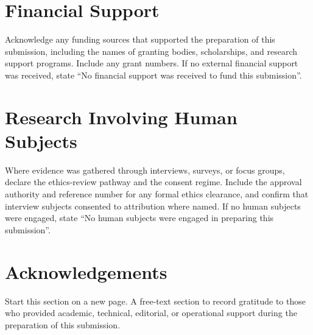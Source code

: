 \section{Financial Support}

\begin{instructional}
Acknowledge any funding sources that supported the preparation of this submission, including the names of granting bodies, scholarships, and research support programs. Include any grant numbers. If no external financial support was received, state ``No financial support was received to fund this submission''.
\end{instructional}


\section{Research Involving Human Subjects}

\begin{instructional}
Where evidence was gathered through interviews, surveys, or focus groups, declare the ethics-review pathway and the consent regime. Include the approval authority and reference number for any formal ethics clearance, and confirm that interview subjects consented to attribution where named. If no human subjects were engaged, state ``No human subjects were engaged in preparing this submission''.
\end{instructional}


\clearpage
\section{Acknowledgements}

\begin{instructional}
Start this section on a new page. A free-text section to record gratitude to those who provided academic, technical, editorial, or operational support during the preparation of this submission.
\end{instructional}


